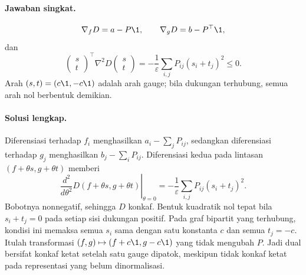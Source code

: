 \paragraph{Jawaban singkat.}
\label{orig03:ps06:answer:0005}
\[
 \nabla_fD=a-P\1,
 \qquad \nabla_gD=b-P^\top\1,
\]
dan
\[
 \begin{pmatrix}s\\t\end{pmatrix}^{\!\top}
 \nabla^2D
 \begin{pmatrix}s\\t\end{pmatrix}
 =-\frac1\varepsilon\sum_{i,j}P_{ij}(s_i+t_j)^2\le0.
\]
Arah $(s,t)=(c\1,-c\1)$ adalah arah gauge; bila dukungan
terhubung, semua arah nol berbentuk demikian.

\paragraph{Solusi lengkap.}
\label{orig03:ps06:solution:0005}
Diferensiasi terhadap $f_i$ menghasilkan
$a_i-\sum_jP_{ij}$, sedangkan diferensiasi terhadap $g_j$ menghasilkan
$b_j-\sum_iP_{ij}$. Diferensiasi kedua pada lintasan
$(f+\theta s,g+\theta t)$ memberi
\[
 \left.\frac{d^2}{d\theta^2}D(f+\theta s,g+\theta t)\right|_{\theta=0}
 =-\frac1\varepsilon\sum_{i,j}P_{ij}(s_i+t_j)^2.
\]
Bobotnya nonnegatif, sehingga $D$ konkaf. Bentuk kuadratik nol tepat bila
$s_i+t_j=0$ pada setiap sisi dukungan positif. Pada graf bipartit yang
terhubung, kondisi ini memaksa semua $s_i$ sama dengan satu konstanta $c$ dan
semua $t_j=-c$. Itulah transformasi
$(f,g)\mapsto(f+c\1,g-c\1)$ yang tidak mengubah $P$. Jadi dual
bersifat konkaf ketat setelah satu gauge dipatok, meskipun tidak konkaf ketat
pada representasi yang belum dinormalisasi.

